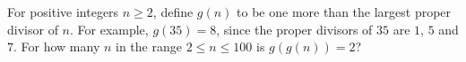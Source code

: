 For positive integers $n\ge2$, define $g(n)$ to be one more than the largest proper divisor of $n$. For example, $g(35)=8$, since the proper divisors of $35$ are $1$, $5$ and $7$. For how many $n$ in the range $2\le n\le100$ is $g(g(n))=2$?
